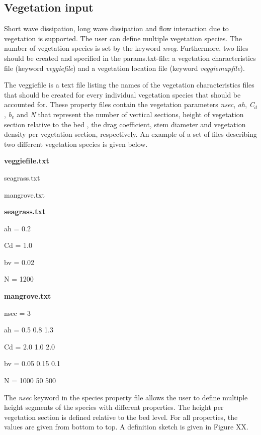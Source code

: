 \documentclass{article}
\begin{document}
\subsection{ Vegetation input}

\noindent Short wave dissipation, long wave dissipation and flow interaction due to vegetation is supported. The user can define multiple vegetation species. The number of vegetation species is set by the keyword \textit{nveg}. Furthermore, two files should be created and specified in the params.txt-file: a vegetation characteristics file (keyword \textit{veggiefile}) and a vegetation location file (keyword \textit{veggiemapfile}). 

\noindent The veggiefile is a text file listing the names of the vegetation characteristics files that should be created for every individual vegetation species that should be accounted for. These property files contain the vegetation parameters \textit{nsec}, \textit{ah}, \textit{C${}_{d}$}, \textit{b${}_{v}$} and \textit{N} that represent the number of vertical sections, height of vegetation section relative to the bed , the drag coefficient, stem diameter and vegetation density per vegetation section, respectively. An example of a set of files describing two different vegetation species is given below.

\noindent \textbf{veggiefile.txt}

\noindent seagrass.txt

\noindent mangrove.txt

\noindent \textbf{seagrass.txt}

\noindent ah = 0.2

\noindent Cd = 1.0

\noindent bv = 0.02

\noindent N = 1200

\noindent \textbf{mangrove.txt}

\noindent nsec = 3

\noindent ah = 0.5 0.8 1.3

\noindent Cd = 2.0 1.0 2.0

\noindent bv = 0.05 0.15 0.1

\noindent N = 1000 50 500

\noindent The \textit{nsec} keyword in the species property file allows the user to define multiple height segments of the species with different properties. The height per vegetation section is defined relative to the bed level. For all properties, the values are given from bottom to top. A definition sketch is given in Figure XX.
\end{document}
